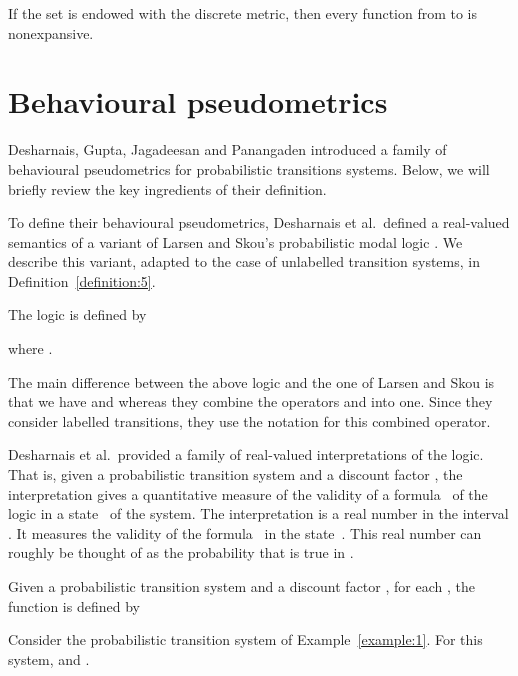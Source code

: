 \documentclass{LMCS}
\begin{document}
\begin{exa}
If the set  is endowed with the discrete metric, then every function
from  to  is nonexpansive.
\end{exa}

\section{Behavioural pseudometrics}
\label{section:3}

Desharnais, Gupta, Jagadeesan and Panangaden \cite{DGJP04:tcs} introduced 
a family of behavioural pseudometrics for probabilistic transitions systems.  
Below, we will briefly review the key ingredients of their definition.  

To define their behavioural pseudometrics, Desharnais et al.\ defined a 
real-valued semantics of a variant of Larsen and Skou's probabilistic
modal logic \cite{LS91:ic}.  We describe this variant, adapted to the case 
of unlabelled transition systems, in Definition~\ref{definition:5}.

\begin{defi}
\label{definition:5}
The logic  is defined by

where .
\end{defi}

The main difference between
the above logic and the one of Larsen and Skou is that we have 
 and  whereas they combine the 
operators  and  into one.  Since they consider
labelled transitions, they use the notation  for this
combined operator.

Desharnais et al.\ provided a family of real-valued interpretations
of the logic.  That is, given a probabilistic transition system and
a discount factor , the interpretation gives a quantitative
measure of the validity of a formula~ of the logic in a 
state~ of the system.  The interpretation 
is a real number in the interval .  It measures the validity
of the formula~ in the state~.  This real number can roughly
be thought of as the probability that  is true in .

\begin{defi}
Given a probabilistic transition system  and 
a discount factor , for each , 
the function  is defined by

\end{defi}

\begin{exa}
Consider the probabilistic transition system of Example~\ref{example:1}.
For this system, 
and .
\end{exa}
\end{document}
